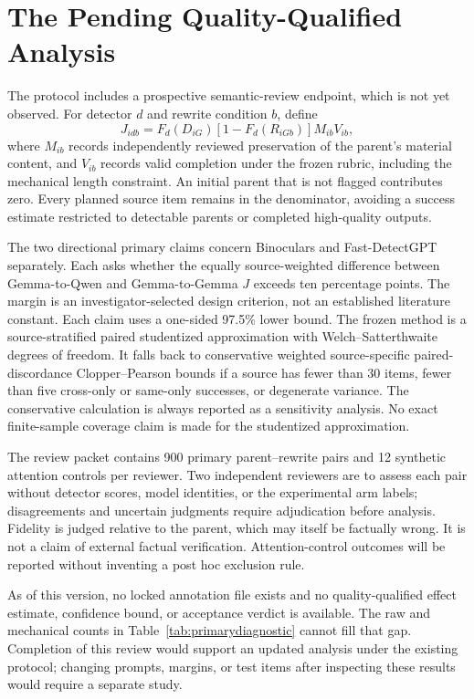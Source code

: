 \section{The Pending Quality-Qualified Analysis}
The protocol includes a prospective semantic-review endpoint, which is not yet observed. For detector $d$ and rewrite condition $b$, define
\begin{equation}
J_{idb}=F_d(D_{iG})[1-F_d(R_{iGb})]M_{ib}V_{ib},
\end{equation}
where $M_{ib}$ records independently reviewed preservation of the parent's material content, and $V_{ib}$ records valid completion under the frozen rubric, including the mechanical length constraint. An initial parent that is not flagged contributes zero. Every planned source item remains in the denominator, avoiding a success estimate restricted to detectable parents or completed high-quality outputs.

The two directional primary claims concern Binoculars and Fast-DetectGPT separately. Each asks whether the equally source-weighted difference between Gemma-to-Qwen and Gemma-to-Gemma $J$ exceeds ten percentage points. The margin is an investigator-selected design criterion, not an established literature constant. Each claim uses a one-sided 97.5\% lower bound. The frozen method is a source-stratified paired studentized approximation with Welch--Satterthwaite degrees of freedom. It falls back to conservative weighted source-specific paired-discordance Clopper--Pearson bounds if a source has fewer than 30 items, fewer than five cross-only or same-only successes, or degenerate variance. The conservative calculation is always reported as a sensitivity analysis. No exact finite-sample coverage claim is made for the studentized approximation.

The review packet contains 900 primary parent--rewrite pairs and 12 synthetic attention controls per reviewer. Two independent reviewers are to assess each pair without detector scores, model identities, or the experimental arm labels; disagreements and uncertain judgments require adjudication before analysis. Fidelity is judged relative to the parent, which may itself be factually wrong. It is not a claim of external factual verification. Attention-control outcomes will be reported without inventing a post hoc exclusion rule.

As of this version, no locked annotation file exists and no quality-qualified effect estimate, confidence bound, or acceptance verdict is available. The raw and mechanical counts in Table~\ref{tab:primarydiagnostic} cannot fill that gap. Completion of this review would support an updated analysis under the existing protocol; changing prompts, margins, or test items after inspecting these results would require a separate study.

